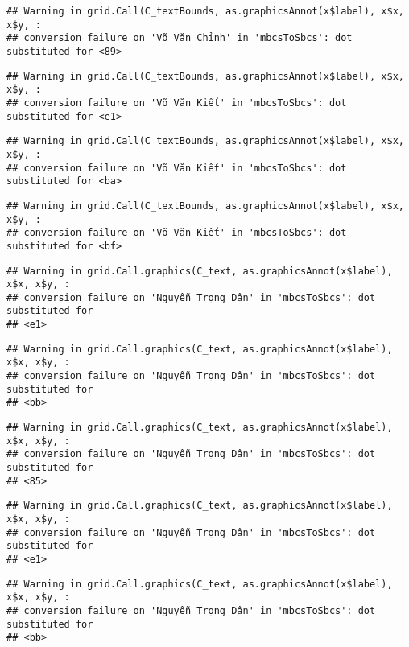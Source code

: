 \documentclass[
]{article}
\begin{document}
\begin{verbatim}
## Warning in grid.Call(C_textBounds, as.graphicsAnnot(x$label), x$x, x$y, :
## conversion failure on 'Võ Văn Chỉnh' in 'mbcsToSbcs': dot substituted for <89>
\end{verbatim}

\begin{verbatim}
## Warning in grid.Call(C_textBounds, as.graphicsAnnot(x$label), x$x, x$y, :
## conversion failure on 'Võ Văn Kiết' in 'mbcsToSbcs': dot substituted for <e1>
\end{verbatim}

\begin{verbatim}
## Warning in grid.Call(C_textBounds, as.graphicsAnnot(x$label), x$x, x$y, :
## conversion failure on 'Võ Văn Kiết' in 'mbcsToSbcs': dot substituted for <ba>
\end{verbatim}

\begin{verbatim}
## Warning in grid.Call(C_textBounds, as.graphicsAnnot(x$label), x$x, x$y, :
## conversion failure on 'Võ Văn Kiết' in 'mbcsToSbcs': dot substituted for <bf>
\end{verbatim}

\begin{verbatim}
## Warning in grid.Call.graphics(C_text, as.graphicsAnnot(x$label), x$x, x$y, :
## conversion failure on 'Nguyễn Trọng Dân' in 'mbcsToSbcs': dot substituted for
## <e1>
\end{verbatim}

\begin{verbatim}
## Warning in grid.Call.graphics(C_text, as.graphicsAnnot(x$label), x$x, x$y, :
## conversion failure on 'Nguyễn Trọng Dân' in 'mbcsToSbcs': dot substituted for
## <bb>
\end{verbatim}

\begin{verbatim}
## Warning in grid.Call.graphics(C_text, as.graphicsAnnot(x$label), x$x, x$y, :
## conversion failure on 'Nguyễn Trọng Dân' in 'mbcsToSbcs': dot substituted for
## <85>
\end{verbatim}

\begin{verbatim}
## Warning in grid.Call.graphics(C_text, as.graphicsAnnot(x$label), x$x, x$y, :
## conversion failure on 'Nguyễn Trọng Dân' in 'mbcsToSbcs': dot substituted for
## <e1>
\end{verbatim}

\begin{verbatim}
## Warning in grid.Call.graphics(C_text, as.graphicsAnnot(x$label), x$x, x$y, :
## conversion failure on 'Nguyễn Trọng Dân' in 'mbcsToSbcs': dot substituted for
## <bb>
\end{verbatim}
\end{document}
